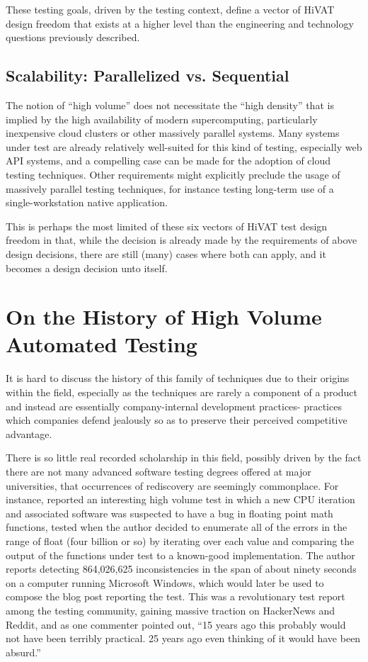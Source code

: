 These testing goals, driven by the testing context, define a vector of HiVAT design freedom that exists at a higher level than the engineering and technology questions previously described.

\subsection{Scalability: Parallelized vs. Sequential}
The notion of ``high volume'' does not necessitate the ``high density'' that is implied by the high availability of modern supercomputing, particularly inexpensive cloud clusters or other massively parallel systems. Many systems under test are already relatively well-suited for this kind of testing, especially web API systems, and a compelling case can be made for the adoption of cloud testing techniques.\citep{parveen2010migrate} Other requirements might explicitly preclude the usage of massively parallel testing techniques, for instance testing long-term use of a single-workstation native application.

This is perhaps the most limited of these six vectors of HiVAT test design freedom in that, while the decision is already made by the requirements of above design decisions, there are still (many) cases where both can apply, and it becomes a design decision unto itself.

\section{On the History of High Volume Automated Testing}
It is hard to discuss the history of this family of techniques due to their origins within the field, especially as the techniques are rarely a component of a product and instead are essentially company-internal development practices- practices which companies defend jealously so as to preserve their perceived competitive advantage.

There is so little real recorded scholarship in this field, possibly driven by the fact there are not many advanced software testing degrees offered at major universities, that occurrences of rediscovery are seemingly commonplace. For instance, \citet{dawsonFourBillion} reported an interesting high volume test in which a new CPU iteration and associated software was suspected to have a bug in floating point math functions, tested when the author decided to enumerate all of the errors in the range of float (four billion or so) by iterating over each value and comparing the output of the functions under test to a known-good implementation. The author reports detecting 864,026,625 inconsistencies in the span of about ninety seconds on a computer running Microsoft Windows, which would later be used to compose the blog post reporting the test. This was a revolutionary test report among the testing community, gaining massive traction on HackerNews and Reddit, and as one commenter pointed out, ``15 years ago this probably would not have been terribly practical. 25 years ago even thinking of it would have been absurd.''

